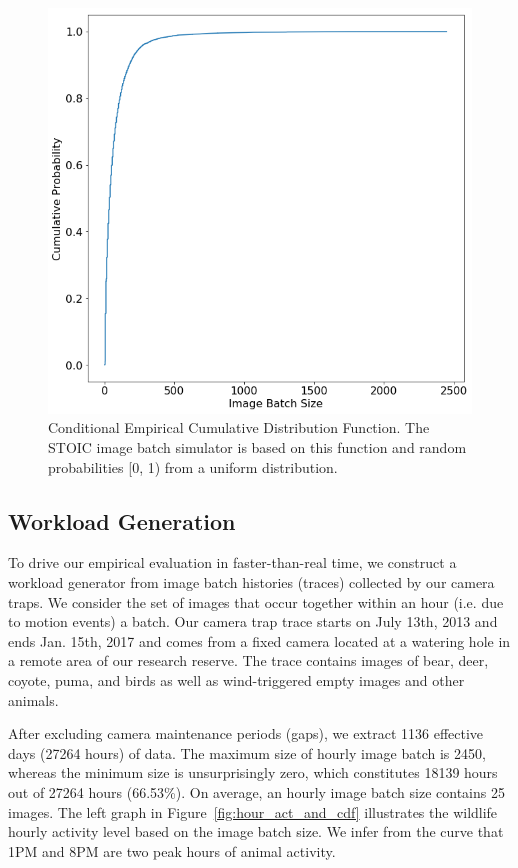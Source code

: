 { 
\begin{figure}[t] \centering 
\includegraphics[scale=0.4]{figures/ecdf.png}
\caption{Conditional Empirical Cumulative Distribution Function. The STOIC image batch simulator is based on this function and random probabilities [0, 1) from a uniform distribution.
\label{fig:cecdf}}
\end{figure} 
}
 
\subsection{Workload Generation}
\label{sec:workloadgen}

To drive our empirical evaluation in faster-than-real time,  we construct a workload generator from image batch histories (traces) collected by our camera traps. We consider the set of images that occur together within an hour (i.e. due to motion events) a batch. Our camera trap trace starts on July 13th, 2013 and ends Jan. 15th, 2017 and comes from a fixed camera located at a watering hole in a remote area of our research reserve. The trace contains images of bear, deer, coyote, puma, and birds as well as wind-triggered empty images and other animals.

After excluding camera maintenance periods (gaps), we  extract 1136 effective days (27264 hours) of data. The maximum size of hourly image batch is 2450, whereas the minimum size is unsurprisingly zero, which constitutes 18139 hours out of 27264 hours (66.53\%). On average, an hourly image batch size contains 25 images. The left graph in Figure~\ref{fig:hour_act_and_cdf} illustrates the wildlife  hourly activity level based on the image batch size. We infer from the curve that 1PM and 8PM are two peak hours of animal activity.

